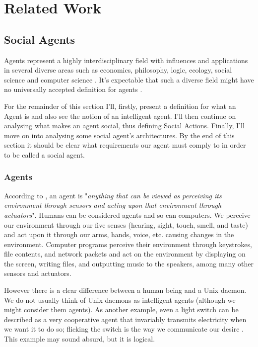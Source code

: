\section{Related Work}

\subsection{Social Agents}
Agents represent a highly interdisciplinary field with influences and applications in several diverse areas such as economics, philosophy, logic, ecology, social science and computer science \cite{wooldridge:multiagent-systems}.
It's expectable that such a diverse field might have no universally accepted definition for agents \cite{wooldridge:intelligentagents}.

For the remainder of this section I'll, firstly, present a definition for what an Agent is and also see the notion of an intelligent agent.
I'll then continue on analysing what makes an agent social, thus defining Social Actions.
Finally, I'll move on into analysing some social agent's architectures.
By the end of this section it should be clear what requirements our agent must comply to in order to be called a social agent.

\subsubsection{Agents}
According to \cite{russell&norvig:aima}, an agent is "\textit{anything that can be viewed as perceiving its environment through sensors and acting upon that environment through actuators}".
Humans can be considered agents and so can computers.
We perceive our environment through our five senses (hearing, sight, touch, smell, and taste) and act upon it through our arms, hands, voice, etc. causing changes in the environment.
Computer programs perceive their environment through keystrokes, file contents, and network packets and act on the environment by displaying on the screen, writing files, and outputting music to the speakers, among many other sensors and actuators.

However there is a clear difference between a human being and a Unix daemon.
We do not usually think of Unix daemons as intelligent agents (although we might consider them agents).
As another example, even a light switch can be described as a very cooperative agent that invariably transmits electricity when we want it to do so; flicking the switch is the way we communicate our desire \cite{shoham:agentorientedprogramming}.
This example may sound absurd, but it is logical.

